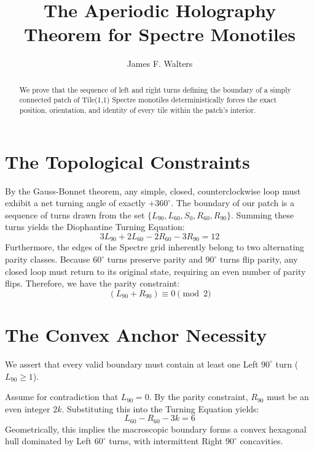 \documentclass[11pt, a4paper]{amsart}
\title{The Aperiodic Holography Theorem for Spectre Monotiles}
\author{James F. Walters}
\begin{document}
\begin{abstract}
We prove that the sequence of left and right turns defining the boundary of a simply connected patch of Tile(1,1) Spectre monotiles deterministically forces the exact position, orientation, and identity of every tile within the patch's interior. 
\end{abstract}

\maketitle

\section{The Topological Constraints}
By the Gauss-Bonnet theorem, any simple, closed, counterclockwise loop must exhibit a net turning angle of exactly $+360^\circ$. The boundary of our patch is a sequence of turns drawn from the set $\{L_{90}, L_{60}, S_{0}, R_{60}, R_{90}\}$. Summing these turns yields the Diophantine Turning Equation:
\begin{equation}
3L_{90} + 2L_{60} - 2R_{60} - 3R_{90} = 12
\end{equation}
Furthermore, the edges of the Spectre grid inherently belong to two alternating parity classes. Because $60^\circ$ turns preserve parity and $90^\circ$ turns flip parity, any closed loop must return to its original state, requiring an even number of parity flips. Therefore, we have the parity constraint:
\begin{equation}
(L_{90} + R_{90}) \equiv 0 \pmod 2
\end{equation}

\section{The Convex Anchor Necessity}
We assert that every valid boundary must contain at least one Left $90^\circ$ turn ($L_{90} \ge 1$). 

Assume for contradiction that $L_{90} = 0$. By the parity constraint, $R_{90}$ must be an even integer $2k$. Substituting this into the Turning Equation yields:
\begin{equation}
L_{60} - R_{60} - 3k = 6
\end{equation}
Geometrically, this implies the macroscopic boundary forms a convex hexagonal hull dominated by Left $60^\circ$ turns, with intermittent Right $90^\circ$ concavities. 
\end{document}
